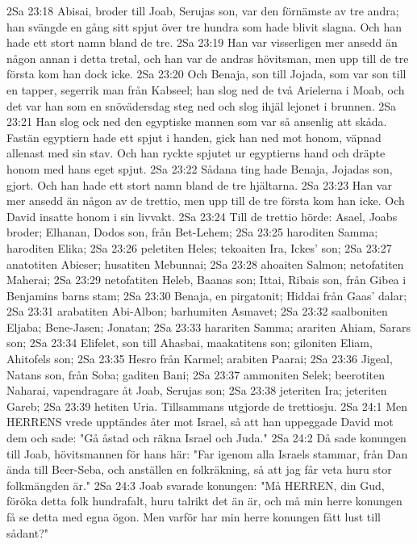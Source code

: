 2Sa 23:18  Abisai, broder till Joab, Serujas son, var den förnämste av tre andra; han svängde en gång sitt spjut över tre hundra som hade blivit slagna. Och han hade ett stort namn bland de tre.
2Sa 23:19  Han var visserligen mer ansedd än någon annan i detta tretal, och han var de andras hövitsman, men upp till de tre första kom han dock icke.
2Sa 23:20  Och Benaja, son till Jojada, som var son till en tapper, segerrik man från Kabseel; han slog ned de två Arielerna i Moab, och det var han som en snövädersdag steg ned och slog ihjäl lejonet i brunnen.
2Sa 23:21  Han slog ock ned den egyptiske mannen som var så ansenlig att skåda. Fastän egyptiern hade ett spjut i handen, gick han ned mot honom, väpnad allenast med sin stav. Och han ryckte spjutet ur egyptierns hand och dräpte honom med hans eget spjut.
2Sa 23:22  Sådana ting hade Benaja, Jojadas son, gjort. Och han hade ett stort namn bland de tre hjältarna.
2Sa 23:23  Han var mer ansedd än någon av de trettio, men upp till de tre första kom han icke. Och David insatte honom i sin livvakt.
2Sa 23:24  Till de trettio hörde: Asael, Joabs broder; Elhanan, Dodos son, från Bet-Lehem;
2Sa 23:25  haroditen Samma; haroditen Elika;
2Sa 23:26  peletiten Heles; tekoaiten Ira, Ickes' son;
2Sa 23:27  anatotiten Abieser; husatiten Mebunnai;
2Sa 23:28  ahoaiten Salmon; netofatiten Maherai;
2Sa 23:29  netofatiten Heleb, Baanas son; Ittai, Ribais son, från Gibea i Benjamins barns stam;
2Sa 23:30  Benaja, en pirgatonit; Hiddai från Gaas' dalar;
2Sa 23:31  arabatiten Abi-Albon; barhumiten Asmavet;
2Sa 23:32  saalboniten Eljaba; Bene-Jasen; Jonatan;
2Sa 23:33  harariten Samma; arariten Ahiam, Sarars son;
2Sa 23:34  Elifelet, son till Ahasbai, maakatitens son; giloniten Eliam, Ahitofels son;
2Sa 23:35  Hesro från Karmel; arabiten Paarai;
2Sa 23:36  Jigeal, Natans son, från Soba; gaditen Bani;
2Sa 23:37  ammoniten Selek; beerotiten Naharai, vapendragare åt Joab, Serujas son;
2Sa 23:38  jeteriten Ira; jeteriten Gareb;
2Sa 23:39  hetiten Uria. Tillsammans utgjorde de trettiosju.
2Sa 24:1  Men HERRENS vrede upptändes åter mot Israel, så att han uppeggade David mot dem och sade: "Gå åstad och räkna Israel och Juda."
2Sa 24:2  Då sade konungen till Joab, hövitsmannen för hans här: "Far igenom alla Israels stammar, från Dan ända till Beer-Seba, och anställen en folkräkning, så att jag får veta huru stor folkmängden är."
2Sa 24:3  Joab svarade konungen: "Må HERREN, din Gud, föröka detta folk hundrafalt, huru talrikt det än är, och må min herre konungen få se detta med egna ögon. Men varför har min herre konungen fått lust till sådant?"
